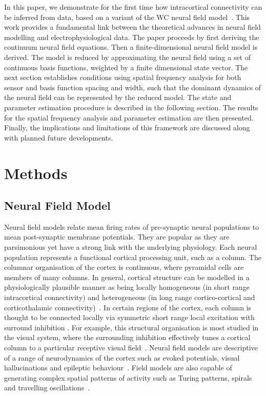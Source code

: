 \documentclass[12pt]{iopart}
\begin{document}
In this paper, we demonstrate for the first time how intracortical connectivity can be inferred from data, based on a variant of the WC neural field model~\cite{Wilson1973}. This work provides a fundamental link between the theoretical advances in neural field modelling and electrophysiological data. The paper proceeds by first deriving the continuum neural field equations. Then a finite-dimensional neural field model is derived. The model is reduced by approximating the neural field using a set of continuous basis functions, weighted by a finite dimensional state vector. The next section establishes conditions using spatial frequency analysis for both sensor and basis function spacing and width, such that the dominant dynamics of the neural field can be represented by the reduced model. The state and parameter estimation procedure is described in the following section. The results for the spatial frequency analysis and parameter estimation are then presented. Finally, the implications and limitations of this framework are discussed along with planned future developments.

\section{Methods}

\subsection{Neural Field Model}\label{NeuralModelSection} 
Neural field models relate mean firing rates of pre-synaptic neural populations to mean post-synaptic membrane potentials. They are popular as they are parsimonious yet have a strong link with the underlying physiology. Each neural population represents a functional cortical processing unit, such as a column. The columnar organisation of the cortex is continuous, where pyramidal cells are members of many columns. In general, cortical structure can be modelled in a physiologically plausible manner as being locally homogeneous (in short range intracortical connectivity) and heterogeneous (in long range cortico-cortical and corticothalamic connectivity)~\cite{Jirsa2009,Qubbaj2007}. In certain regions of the cortex, each column is thought to be connected locally via symmetric short range local excitation with surround inhibition \cite{Braitenberg1998}. For example, this structural organisation is most studied in the visual system, where the surrounding inhibition effectively tunes a cortical column to a particular receptive visual field~\cite{Sullivan2006}. Neural field models are descriptive of a range of neurodynamics of the cortex such as evoked potentials, visual hallucinations and epileptic behaviour~\cite{David2003,Bressloff2001,Breakspear2006}. Field models are also capable of generating complex spatial patterns of activity such as Turing patterns, spirals and travelling oscillations~\cite{Amari1977,Coombes2005,Coombes2007}.
\end{document}
